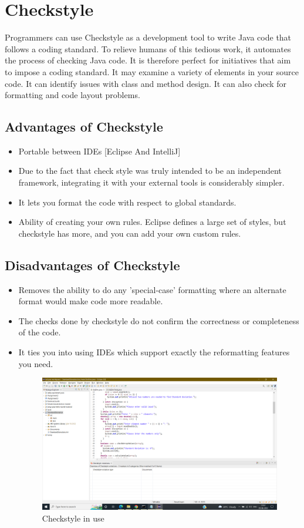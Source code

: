 \documentclass[a4paper, 12pt]{article}
\begin{document}
\newpage
\section{Checkstyle}
Programmers can use Checkstyle as a development tool to write Java code that follows a coding standard. To relieve humans of this tedious work, it automates the process of checking Java code. It is therefore perfect for initiatives that aim to impose a coding standard. It may examine a variety of elements in your source code. It can identify issues with class and method design. It can also check for formatting and code layout problems.
\subsection{Advantages of Checkstyle}
\begin{itemize}
    \item Portable between IDEs [Eclipse And IntelliJ]
    \item Due to the fact that check style was truly intended to be an independent framework, integrating it with your external tools is considerably simpler.
    \item It lets you format the code with respect to global standards. 
    \item Ability of creating your own rules. Eclipse defines a large set of styles, but checkstyle has more, and you can add your own custom rules.

\end{itemize}
\subsection{Disadvantages of Checkstyle}
\begin{itemize}
    \item Removes the ability to do any 'special-case' formatting where an alternate format would make code more readable.
    \item The checks done by checkstyle do not confirm the correctness or completeness of the code.
    \item It ties you into using IDEs which support exactly the reformatting features you need.
    
\begin{figure}[h]
    \centering
    \includegraphics[width=0.87\linewidth]{Images/Checkstyle.png}
    \caption{Checkstyle in use}
    \label{fig:Checkstyle Image}
\end{figure}
\end{itemize}
\end{document}

